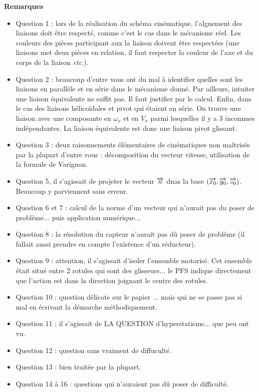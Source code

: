 \documentclass[10pt,fleqn]{article} %
\begin{document}
\textbf{Remarques}
\begin{itemize}
\item Question 1 : lors de la réalisation du schéma cinématique, l'algnement des liaisons doit être respecté, comme c'est le cas dans le mécanisme réel. Les couleurs des pièces participant aux la liaison doivent être respectées (une liaisons met deux pièces en relation, il faut respecter la couleur de l'axe et du corps de la liaison \textit{etc}.). 
\item Question 2 : beaucoup d'entre vous ont du mal à identifier quelles sont les liaisons en parallèle et en série dans le mécanisme donné. Par ailleurs, intuiter une liaison équivalente ne suffit pas. Il faut justifier par le calcul. 
Enfin, dans le cas des liaisons hélicoïdales et pivot qui étaient en série. On trouve une liaison avec une composante en $\omega_x$ et en $V_x$ parmi lesquelles il y a 3 inconnues indépendantes. La liaison équivalente est donc une liaison pivot glissant.
\item Question 3 : deux raisonnements élémentaires de cinématiques non maîtrisés par la plupart d'entre vous : décomposition du vecteur vitesse, utilisation de la formule de Varignon.
\item Question 5, il s'agissait de projeter le vecteur $\overrightarrow{n}$ dnas la base $\left(\overrightarrow{x_0},\overrightarrow{y_0},\overrightarrow{z_0} \right)$. Beaucoup y parviennent sans erreur.
\item Question 6 et 7 : calcul de la norme d'un vecteur qui n'aurait pas du poser de problème... puis application numérique...
\item Question 8 : la résolution du capteur n'aurait pas dû poser de problème (il fallait aussi prendre en compte l'existence d'un réducteur).
\item Question 9 : attention, il s'agissait d'isoler l'ensemble motorisé. Cet ensemble était situé entre 2 rotules qui sont des glisseurs... le PFS indique directement que l'action est dans la direction joignant le centre des rotules.
\item Question 10 : question délicate sur le papier ... mais qui ne se passe pas si mal en écrivant la démarche méthodiquement. 
\item Question 11 : il s'agissait de LA QUESTION d'hyperstatisme... que peu ont vu.
\item Question 12 : question sans vraiment de diffuculté. 
\item Question 13 : bien traitée par la plupart.
\item Question 14 à 16 : questions qui n'auraient pas dû poser de difficulté. 

\end{itemize}
\end{document}
